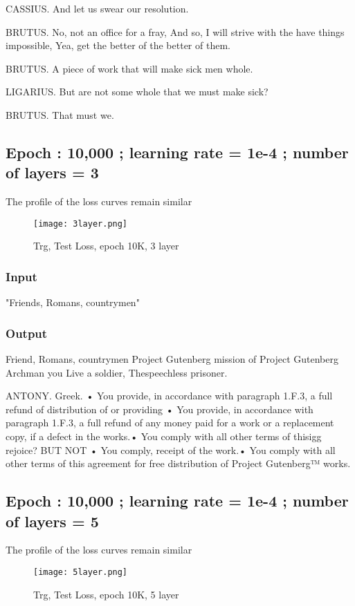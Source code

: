 \documentclass[conference]{IEEEtran}
\begin{document}
CASSIUS.
And let us swear our resolution.

BRUTUS.
No, not an office for a fray, And so, I will strive with the have things impossible, Yea, get the better of the better of them.

BRUTUS. A piece of work that will make sick men whole. 

LIGARIUS.
But are not some whole that we must make sick?

BRUTUS.
That must we.

\subsection{Epoch : 10,000 ; learning rate = 1e-4 ; number of layers = 3}
The profile of the loss curves remain similar
\begin{figure}[H]
    \centering
    \texttt{[image: 3layer.png]}
    \caption{Trg, Test Loss, epoch 10K, 3 layer}
    \label{fig:epoch}
\end{figure}
\subsubsection{Input}
"Friends, Romans, countrymen"
\subsubsection{Output}
Friend, Romans, countrymen Project Gutenberg mission of Project Gutenberg
Archman you Live a soldier,
Thespeechless prisoner.

ANTONY.
 Greek. • You provide, in accordance with paragraph 1.F.3, a full refund of      distribution of or providing • You provide, in accordance with paragraph 1.F.3, a full refund of any money paid for a work or a replacement copy, if a defect in the  works.• You comply with all other terms of thisigg rejoice? BUT NOT • You comply, receipt of the work.• You comply with all other terms of this agreement for free    distribution of Project Gutenberg™ works.

 \subsection{Epoch : 10,000 ; learning rate = 1e-4 ; number of layers = 5}
 The profile of the loss curves remain similar
\begin{figure}[H]
    \centering
    \texttt{[image: 5layer.png]}
    \caption{Trg, Test Loss, epoch 10K, 5 layer}
    \label{fig:epoch}
\end{figure}
\end{document}
